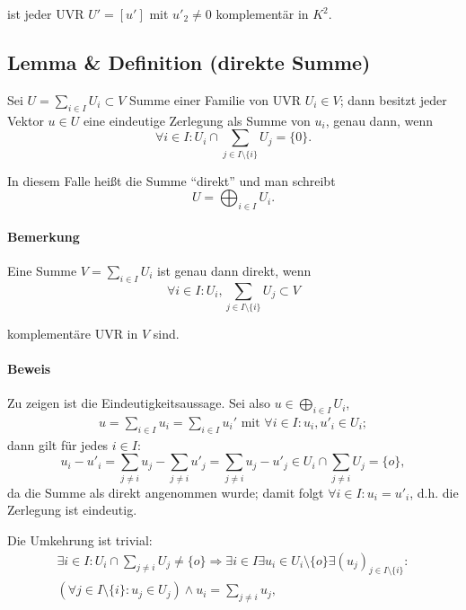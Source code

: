 	ist jeder UVR $ U' = [u']$ mit $u'_2\neq 0 $ komplementär in $ K^2 $.
	
\subsection{Lemma \& Definition (direkte Summe)}
	\begin{Definition}
	Sei $ U= \sum_{i\in I}U_i\subset V $ Summe einer Familie von UVR $ U_i\in V $; dann besitzt jeder Vektor $ u\in U $ eine eindeutige Zerlegung als Summe von $ u_i $, genau dann, wenn
		\begin{equation*}
		\forall i\in I: U_i\cap \sum_{j\in I\setminus \{i\}}U_j = \{0 \}.
		\end{equation*}
		
	In diesem Falle heißt die Summe "`direkt"' und man schreibt
	\[ U = \bigoplus_{i\in I} U_i. \]
	\end{Definition}
		
\paragraph{Bemerkung}
	Eine Summe $ V = \sum_{i\in I} U_i $ ist genau dann direkt, wenn
		\begin{equation*}
		\forall i\in I: U_i, \sum_{j\in I\setminus\{i\}}U_j \subset V
		\end{equation*}
		
	komplementäre UVR in $ V $ sind.

\paragraph{Beweis}
	Zu zeigen ist die Eindeutigkeitsaussage. Sei also $ u \in \bigoplus_{i\in I}U_i $,
		\begin{gather*}
		u = \sum_{i\in I} u_i = \sum_{i\in I} u_i' \text{ mit } \forall i\in I: u_i,u'_i\in U_i;
		\end{gather*}
	dann gilt für jedes $ i\in I$:
		\begin{equation*}
		u_i-u'_i = \sum _{j\neq i}u_j-\sum_{j\neq i} u'_j = \sum_{j\neq i}u_j-u'_j \in U_i\cap \sum_{j\neq i} U_j = \{o\},
		\end{equation*}
	da die Summe als direkt angenommen wurde; damit folgt $ \forall i \in I: u_i = u'_i $, d.h. die Zerlegung ist eindeutig.
	
	Die Umkehrung ist trivial:
		\begin{gather*}
		\exists i\in I:U_i\cap \sum_{j\neq i} U_j \neq \{o\} \Rightarrow \exists i\in I\exists u_i\in U_i\setminus\{o\}\exists (u_j)_{j\in I\setminus\{i\}}:\\
		(\forall j\in I\setminus\{i\}:u_j \in U_j)\land u_i = \sum_{j\neq i} u_j,
		\end{gather*}
		
